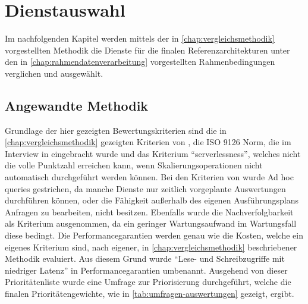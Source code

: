 \chapter{Dienstauswahl}
Im nachfolgenden Kapitel werden mittels der in \autoref{chap:vergleichsmethodik} vorgestellten Methodik die Dienste für die finalen Referenzarchitekturen unter den in \autoref{chap:rahmendatenverarbeitung} vorgestellten Rahmenbedingungen verglichen und ausgewählt.

\section{Angewandte Methodik}

Grundlage der hier gezeigten Bewertungskriterien sind die in \autoref{chap:vergleichsmethodik} gezeigten Kriterien von \citeauthor{Marz.2015}, die ISO 9126 Norm, die im Interview in  eingebracht wurde und das Kriterium \enquote{serverlessness}, welches nicht die volle Punktzahl erreichen kann, wenn Skalierungsoperationen nicht automatisch durchgeführt werden können. Bei den Kriterien von \citeauthor{Marz.2015} wurde Ad hoc queries gestrichen, da manche Dienste nur zeitlich vorgeplante Auswertungen durchführen können, oder die Fähigkeit außerhalb des eigenen Ausführungsplans Anfragen zu bearbeiten, nicht besitzen. Ebenfalls wurde die Nachverfolgbarkeit als Kriterium ausgenommen, da ein geringer Wartungsaufwand im Wartungsfall diese bedingt. Die Performancegarantien werden genau wie die Kosten, welche ein eigenes Kriterium sind, nach eigener, in \autoref{chap:vergleichsmethodik} beschriebener Methodik evaluiert. Aus diesem Grund wurde \enquote{Lese- und Schreibzugriffe mit niedriger Latenz} in Performancegarantien umbenannt. Ausgehend von dieser Prioritätenliste wurde eine Umfrage zur Priorisierung durchgeführt, welche die finalen Prioritätengewichte, wie in \autoref{tab:umfragen-auswertungen} gezeigt, ergibt. 

